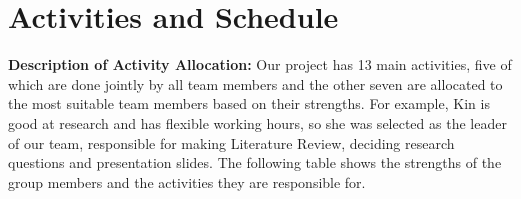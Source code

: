 \documentclass[10pt,a4paper,oneside]{report}
\begin{document}
\setlength{\parindent}{0pt} %

\vspace{-4cm}\section{Activities and Schedule}

\textbf{Description of Activity Allocation:}
Our project has 13 main activities, five of which are done jointly by all team members and the other seven are allocated to the most suitable team members based on their strengths. For example, Kin is good at research and has flexible working hours, so she was selected as the leader of our team, responsible for making Literature Review, deciding research questions and presentation slides. The following table shows the strengths of the group members and the activities they are responsible for.
\end{document}

